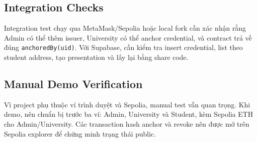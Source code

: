 \subsection{Integration Checks}

Integration test chạy qua MetaMask/Sepolia hoặc local fork cần xác nhận rằng Admin có thể thêm issuer, University có thể anchor credential, và contract trả về đúng \texttt{anchoredBy(uid)}. Với Supabase, cần kiểm tra insert credential, list theo student address, tạo presentation và lấy lại bằng share code.

\subsection{Manual Demo Verification}

Vì project phụ thuộc ví trình duyệt và Sepolia, manual test vẫn quan trọng. Khi demo, nên chuẩn bị trước ba ví: Admin, University và Student, kèm Sepolia ETH cho Admin/University. Các transaction hash anchor và revoke nên được mở trên Sepolia explorer để chứng minh trạng thái public.
